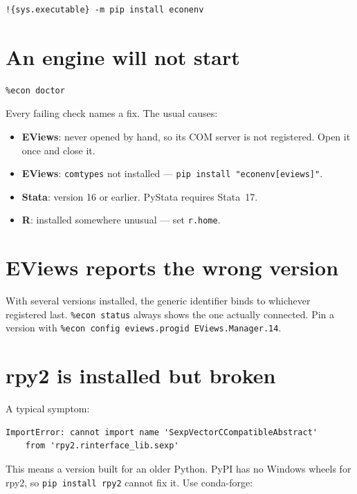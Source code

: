\documentclass[11pt,a4paper]{report}
\begin{document}
\begin{lstlisting}
!{sys.executable} -m pip install econenv
\end{lstlisting}

\section{An engine will not start}

\begin{lstlisting}
%econ doctor
\end{lstlisting}

Every failing check names a fix. The usual causes:

\begin{itemize}
  \item \textbf{EViews}: never opened by hand, so its COM server is not
        registered. Open it once and close it.
  \item \textbf{EViews}: \texttt{comtypes} not installed ---
        \texttt{pip install "econenv[eviews]"}.
  \item \textbf{Stata}: version 16 or earlier. PyStata requires Stata~17.
  \item \textbf{R}: installed somewhere unusual --- set \texttt{r.home}.
\end{itemize}

\section{EViews reports the wrong version}

With several versions installed, the generic identifier binds to whichever
registered last. \texttt{\%econ status} always shows the one actually connected.
Pin a version with \texttt{\%econ config eviews.progid EViews.Manager.14}.

\section{rpy2 is installed but broken}
\label{sec:rpy2}

A typical symptom:

\begin{lstlisting}
ImportError: cannot import name 'SexpVectorCCompatibleAbstract'
    from 'rpy2.rinterface_lib.sexp'
\end{lstlisting}

This means a version built for an older Python. PyPI has no Windows wheels for
rpy2, so \texttt{pip install rpy2} cannot fix it. Use conda-forge:
\end{document}
